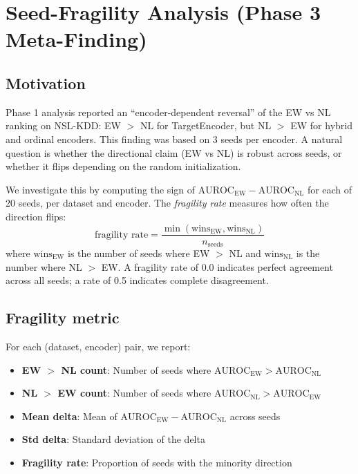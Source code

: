 \section{Seed-Fragility Analysis (Phase 3 Meta-Finding)}
\label{sec:fragility}

\subsection{Motivation}

Phase 1 analysis reported an ``encoder-dependent reversal'' of the EW vs NL ranking on NSL-KDD: EW $>$ NL for TargetEncoder, but NL $>$ EW for hybrid and ordinal encoders. This finding was based on 3 seeds per encoder. A natural question is whether the directional claim (EW vs NL) is robust across seeds, or whether it flips depending on the random initialization.

We investigate this by computing the sign of $\text{AUROC}_{\text{EW}} - \text{AUROC}_{\text{NL}}$ for each of 20 seeds, per dataset and encoder. The \emph{fragility rate} measures how often the direction flips:
\begin{equation}
\text{fragility rate} = \frac{\min(\text{wins}_{\text{EW}}, \text{wins}_{\text{NL}})}{n_{\text{seeds}}}
\label{eq:fragility}
\end{equation}
where $\text{wins}_{\text{EW}}$ is the number of seeds where EW $>$ NL and $\text{wins}_{\text{NL}}$ is the number where NL $>$ EW. A fragility rate of 0.0 indicates perfect agreement across all seeds; a rate of 0.5 indicates complete disagreement.

\subsection{Fragility metric}

For each (dataset, encoder) pair, we report:

\begin{itemize}
\item \textbf{EW $>$ NL count}: Number of seeds where $\text{AUROC}_{\text{EW}} > \text{AUROC}_{\text{NL}}$
\item \textbf{NL $>$ EW count}: Number of seeds where $\text{AUROC}_{\text{NL}} > \text{AUROC}_{\text{EW}}$
\item \textbf{Mean delta}: Mean of $\text{AUROC}_{\text{EW}} - \text{AUROC}_{\text{NL}}$ across seeds
\item \textbf{Std delta}: Standard deviation of the delta
\item \textbf{Fragility rate}: Proportion of seeds with the minority direction
\end{itemize}

